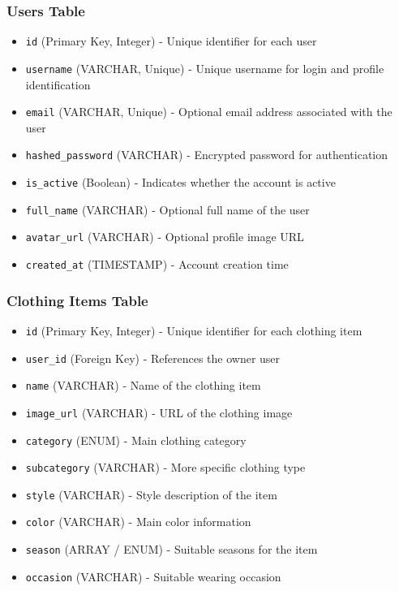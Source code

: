 \begin{appendices}
\subsubsection{Users Table}
\begin{itemize}
    \item \texttt{id} (Primary Key, Integer) - Unique identifier for each user
    \item \texttt{username} (VARCHAR, Unique) - Unique username for login and profile identification
    \item \texttt{email} (VARCHAR, Unique) - Optional email address associated with the user
    \item \texttt{hashed\_password} (VARCHAR) - Encrypted password for authentication
    \item \texttt{is\_active} (Boolean) - Indicates whether the account is active
    \item \texttt{full\_name} (VARCHAR) - Optional full name of the user
    \item \texttt{avatar\_url} (VARCHAR) - Optional profile image URL
    \item \texttt{created\_at} (TIMESTAMP) - Account creation time
\end{itemize}

\subsubsection{Clothing Items Table}
\begin{itemize}
    \item \texttt{id} (Primary Key, Integer) - Unique identifier for each clothing item
    \item \texttt{user\_id} (Foreign Key) - References the owner user
    \item \texttt{name} (VARCHAR) - Name of the clothing item
    \item \texttt{image\_url} (VARCHAR) - URL of the clothing image
    \item \texttt{category} (ENUM) - Main clothing category
    \item \texttt{subcategory} (VARCHAR) - More specific clothing type
    \item \texttt{style} (VARCHAR) - Style description of the item
    \item \texttt{color} (VARCHAR) - Main color information
    \item \texttt{season} (ARRAY / ENUM) - Suitable seasons for the item
    \item \texttt{occasion} (VARCHAR) - Suitable wearing occasion
\end{itemize}


\end{appendices}
